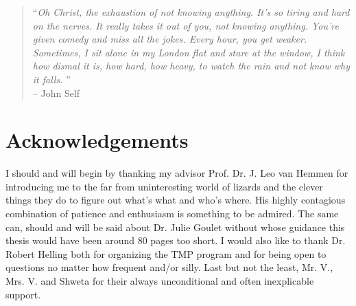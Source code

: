 \vspace*{\fill}
\begin{quote}
\small
``\emph{Oh Christ, the exhaustion of not knowing anything. It’s so tiring and hard on the nerves. 
It really takes it out of you, not knowing anything. You’re given comedy and miss all the jokes. 
Every hour, you get weaker. Sometimes, I sit alone in my London flat and stare at the window, 
I think how dismal it is, how hard, how heavy, to watch the rain and not know why it falls. }''\\
\normalsize
\flushright -- John Self\\
\end{quote}

\vspace*{\fill}


\chapter*{Acknowledgements}
I should and will begin by thanking my advisor Prof. Dr. J. Leo van Hemmen
for introducing me to the far from uninteresting world of lizards and
the clever things they do to figure out what's what and who's where. His 
highly contagious combination
of patience and enthusiasm is something to be admired. The same can, should and will be said
about Dr. Julie Goulet without whose guidance this thesis would have been around 80
pages too short.
I would also like to thank Dr. Robert Helling both for organizing the TMP program
and for being open to questions no matter how frequent and/or silly.
Last but not the least, Mr. V., Mrs. V. and Shweta for their always unconditional and often
inexplicable support.